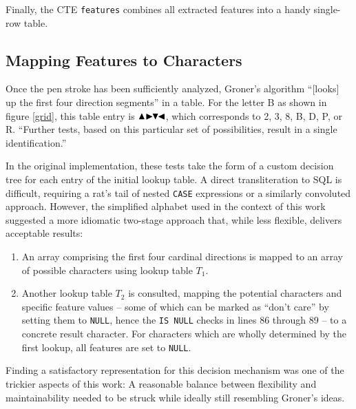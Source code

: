 \documentclass[sigconf]{acmart}
\begin{document}
Finally, the CTE \texttt{features} combines all extracted features into a handy single-row table.

\subsection{Mapping Features to Characters}

Once the pen stroke has been sufficiently analyzed, Groner's algorithm \enquote{[looks] up the first four direction segments} in a table. For the letter B as shown in figure \ref{grid}, this table entry is $\blacktriangle\hspace{-0.26em}\blacktriangleright\hspace{-0.40em}\blacktriangledown\hspace{-0.40em}\blacktriangleleft$, which corresponds to 2, 3, 8, B, D, P, or R. \enquote{Further tests, based on this particular set of possibilities, result in a single identification.} \cite{groner}

In the original implementation, these tests take the form of a custom decision tree for each entry of the initial lookup table. A direct transliteration to SQL is difficult, requiring a rat's tail of nested \texttt{CASE} expressions or a similarly convoluted approach. However, the simplified alphabet used in the context of this work suggested a more idiomatic two-stage approach that, while less flexible, delivers acceptable results:

\begin{enumerate}[nolistsep]
    \item An array comprising the first four cardinal directions is mapped to an array of possible characters using lookup table $T_1$.
    \item Another lookup table $T_2$ is consulted, mapping the potential characters and specific feature values – some of which can be marked as \enquote{don't care} by setting them to \texttt{NULL}, hence the \texttt{IS NULL} checks in lines 86 through 89 – to a concrete result character. For characters which are wholly determined by the first lookup, all features are set to \texttt{NULL}.
\end{enumerate}

Finding a satisfactory representation for this decision mechanism was one of the trickier aspects of this work: A reasonable balance between flexibility and maintainability needed to be struck while ideally still resembling Groner's ideas.
\end{document}
